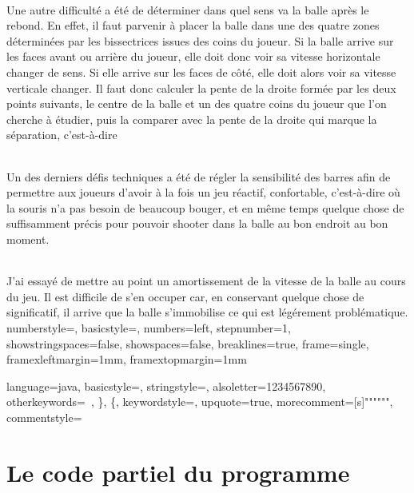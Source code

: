 \documentclass[a4paper,12pt]{report}
\begin{document}
\paragraph{}
Une autre difficulté a été de déterminer dans quel sens va la balle après le rebond. En effet, il faut parvenir à placer la balle dans une des quatre zones déterminées par les bissectrices issues des coins du joueur. Si la balle arrive sur les faces avant ou arrière du joueur, elle doit donc voir sa vitesse horizontale changer de sens. Si elle arrive sur les faces de côté, elle doit alors voir sa vitesse verticale changer. Il faut donc calculer la pente de la droite formée par les deux points suivants, le centre de la balle et un des quatre coins du joueur que l'on cherche à étudier, puis la comparer avec la pente de la droite qui marque la séparation, c'est-à-dire 
\paragraph{}
Un des derniers défis techniques a été de régler la sensibilité des barres afin de permettre aux joueurs d'avoir à la fois un jeu réactif, confortable, c'est-à-dire où la souris n'a pas besoin de beaucoup bouger, et en même temps quelque chose de suffisamment précis pour pouvoir shooter dans la balle au bon endroit au bon moment.
\paragraph{}
J'ai essayé de mettre au point un amortissement de la vitesse de la balle au cours du jeu. Il est difficile de s'en occuper car, en conservant quelque chose de significatif, il arrive que la balle s'immobilise ce qui est légérement problématique.
\lstset
{
	numberstyle=\footnotesize,
	basicstyle=\ttfamily\footnotesize,
	numbers=left,
	stepnumber=1,
	showstringspaces=false,
	showspaces=false,
	breaklines=true,
	frame=single,
	framexleftmargin=1mm,
	framextopmargin=1mm
}


\lstset{language=Java}
\lstset
{
	language=java,
	basicstyle=\ttfamily\footnotesize,
	stringstyle=\color{red},
	alsoletter={1234567890},
	otherkeywords={\ , \}, \{},
	keywordstyle=\color{blue},
	upquote=true,
	morecomment=[s]{"""}{"""},
	commentstyle=\color{gray}\slshape
}

\part{Le code partiel du programme}
	\setcounter{chapter}{0}
	
	
\end{document}
